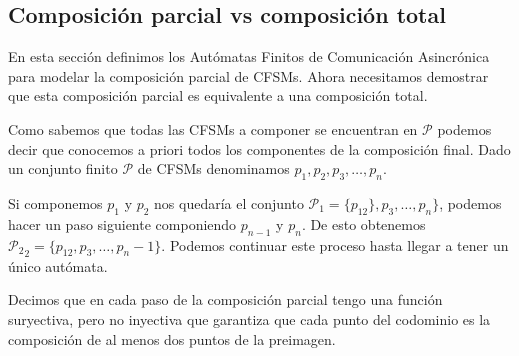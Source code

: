 \documentclass[paper=a4, fontsize=11pt, spanish]{scrartcl} %
\numberwithin{equation}{section} %
\numberwithin{figure}{section} %
\numberwithin{table}{section} %
\begin{document}




\subsection{Composición parcial vs composición total}
En esta sección definimos los Autómatas Finitos de Comunicación Asincrónica para modelar la composición parcial de CFSMs. Ahora necesitamos demostrar que esta composición parcial es equivalente a una composición total.

Como sabemos que todas las CFSMs a componer se encuentran en $\mathcal{P}$ podemos decir que conocemos a priori todos los componentes de la composición final. Dado un conjunto finito $\mathcal{P}$ de CFSMs denominamos $ p_1, p_2, p_3, \ldots, p_n$. 

Si componemos $p_1$ y $p_2$ nos quedaría el conjunto $\mathcal{P}_1 =\{ p_{12} \}, p_3, \ldots, p_n \} $, podemos hacer un paso siguiente componiendo $p_{n-1}$ y $p_n$. De esto obtenemos $\mathcal{P_2}_2= \{ p_{12}, p_3, \ldots, p_n-1 \} $. Podemos continuar este proceso hasta llegar a tener un único autómata. %

Decimos que en cada paso de la composición parcial tengo una función suryectiva, pero no inyectiva que garantiza que cada punto del codominio es la composición de al menos dos puntos de la preimagen.
\end{document}
